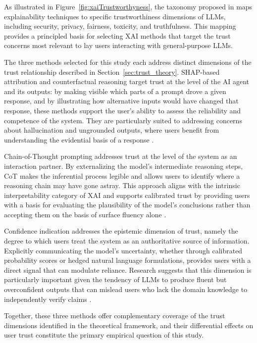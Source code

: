 As illustrated in Figure~\ref{fig:xaiTrustworthyness}, the taxonomy proposed in \cite{wu_usable_2025} maps explainability techniques to specific trustworthiness dimensions of LLMs, including security, privacy, fairness, toxicity, and truthfulness. This mapping provides a principled basis for selecting XAI methods that target the trust concerns most relevant to lay users interacting with general-purpose LLMs.

The three methods selected for this study each address distinct dimensions of the trust relationship described in Section~\ref{sec:trust_theory}. SHAP-based attribution and counterfactual reasoning target trust at the level of the AI agent and its outputs: by making visible which parts of a prompt drove a given response, and by illustrating how alternative inputs would have changed that response, these methods support the user's ability to assess the reliability and competence of the system. They are particularly suited to addressing concerns about hallucination and ungrounded outputs, where users benefit from understanding the evidential basis of a response \cite{wu_usable_2025}.

Chain-of-Thought prompting addresses trust at the level of the system as an interaction partner. By externalizing the model's intermediate reasoning steps, CoT makes the inferential process legible and allows users to identify where a reasoning chain may have gone astray. This approach aligns with the intrinsic interpretability category of XAI and supports calibrated trust by providing users with a basis for evaluating the plausibility of the model's conclusions rather than accepting them on the basis of surface fluency alone \cite{wu_usable_2025}.

Confidence indication addresses the epistemic dimension of trust, namely the degree to which users treat the system as an authoritative source of information. Explicitly communicating the model's uncertainty, whether through calibrated probability scores or hedged natural language formulations, provides users with a direct signal that can modulate reliance. Research suggests that this dimension is particularly important given the tendency of LLMs to produce fluent but overconfident outputs that can mislead users who lack the domain knowledge to independently verify claims \cite{tao_when_2024}.

Together, these three methods offer complementary coverage of the trust dimensions identified in the theoretical framework, and their differential effects on user trust constitute the primary empirical question of this study.